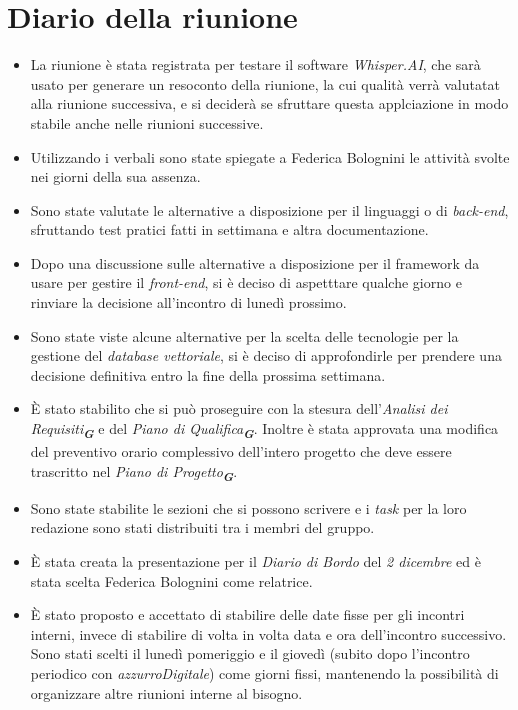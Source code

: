 
\section{Diario della riunione}

\begin{itemize}
    \item La riunione è stata registrata per testare il software \emph{Whisper.AI}, che sarà usato per generare un resoconto della riunione,
    la cui qualità verrà valutatat alla riunione successiva, e si deciderà se sfruttare questa applciazione in modo stabile anche nelle riunioni successive.
    \item Utilizzando i verbali sono state spiegate a Federica Bolognini le attività svolte nei giorni della sua assenza.
    \item Sono state valutate le alternative a disposizione per il linguaggi o di \emph{back-end}, sfruttando test pratici fatti in settimana e altra documentazione.
    \item Dopo una discussione sulle alternative a disposizione per il framework da usare per gestire il \emph{front-end}, si è deciso di aspetttare qualche giorno e
    rinviare la decisione all'incontro di lunedì prossimo.
    \item Sono state viste alcune alternative per la scelta delle tecnologie per la gestione del \emph{database vettoriale}, 
    si è deciso di approfondirle per prendere una decisione definitiva entro la fine della prossima settimana.
    \item È stato stabilito che si può proseguire con la stesura  dell’\emph{Analisi dei Requisiti}\textsubscript{\textit{\textbf{G}}} e del \emph{Piano di Qualifica}\textsubscript{\textit{\textbf{G}}}. 
    Inoltre è stata approvata una modifica del preventivo orario complessivo dell’intero progetto che deve essere trascritto nel 
    \emph{Piano di Progetto}\textsubscript{\textit{\textbf{G}}}.
    \item Sono state stabilite le sezioni che si possono scrivere e i \emph{task} per la loro redazione sono stati distribuiti tra i membri del gruppo.
    \item È stata creata la presentazione per il \emph{Diario di Bordo} del \emph{2 dicembre} ed è stata scelta Federica Bolognini come relatrice.
    \item È stato proposto e accettato di stabilire delle date fisse per gli incontri interni, invece di stabilire di volta in volta data e 
    ora dell’incontro successivo. Sono stati scelti il lunedì pomeriggio e il giovedì (subito dopo l’incontro periodico con \emph{azzurroDigitale}) 
    come giorni fissi, mantenendo la possibilità di organizzare altre riunioni interne al bisogno.
\end{itemize}
